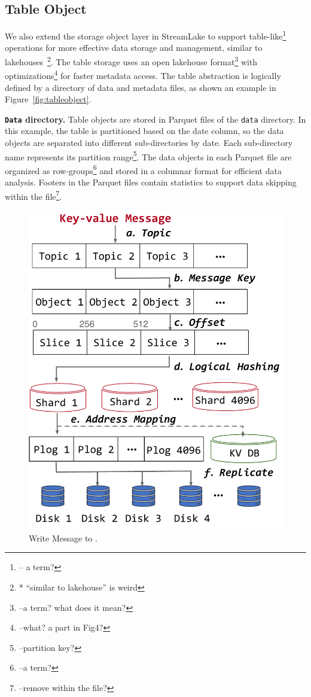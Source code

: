 \subsection{Table Object}
We also extend the storage object layer in StreamLake to support table-like\footnote{-- a term?} operations for more effective data storage and management, similar to lakehouses~\cite{}\footnote{* ``similar to lakehouse'' is weird}. The table storage uses an open lakehouse format\footnote{--a term? what does it mean?} with optimizations\footnote{--what? a part in Fig4?} for faster metadata access. The table abstraction is logically defined by a directory of data and metadata files, as shown an example  in Figure~\ref{fig:tableobject}.

\noindent \textbf{\texttt{Data} directory.} Table objects are stored in Parquet files of the \texttt{data} directory. In this example, the table is partitioned based on the date column, so the data objects are separated into different sub-directories by date. Each sub-directory name represents its partition range\footnote{--partition key?}. The data objects in each Parquet file are organized as row-groups\footnote{--a term?} and stored in a columnar format for efficient data analysis. Footers in the Parquet files contain statistics to support data skipping within the file\footnote{--remove within the file?}.

\begin{figure}[htbp]

	\includegraphics[scale=0.3]{figures/write}
	\centering
	\vspace{-1em}
	\caption{Write Message to \sys.}
	\label{fig:write}
	\vspace{-1em}
\end{figure}


